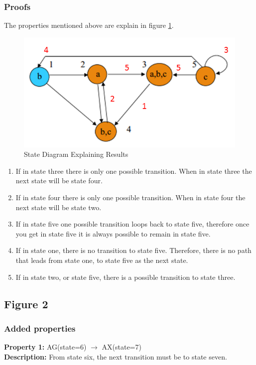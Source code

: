 \documentclass[11pt]{article}
\begin{document}
	\subsubsection{Proofs}
	The properties mentioned above are explain in figure \ref{p2_p}.
	\begin{figure}[h]\centering
	\includegraphics[height=0.45\textwidth]{images/p2_1_proof.png}
		\caption{State Diagram Explaining Results}
			\label{p2_p}
		\end{figure}
\begin{enumerate}
\item If in state three there is only one possible transition. When in state three the next state will be state four.
\item  If in state four there is only one possible transition. When in state four the next state will be state two.
\item  If in state five one possible transition loops back to state five, therefore once you get in state five it is always possible to remain in state five.
\item  If in state one, there is no transition to state five. Therefore, there is no path that leads from state one, to state five as the next state.
\item  If in state two, or state five, there is a possible transition to state three.
\end{enumerate}	

	
\subsection{Figure 2}
	\subsubsection{Added properties}
	
		\textbf{Property 1:} 	AG(state=6) $\to$ AX(state=7) 	\\	
		\textbf{Description:} From state six, the next transition must be to state seven. \\
		\vspace{12pt}
		
\end{document}
